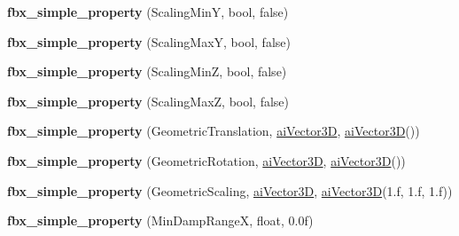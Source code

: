 \begin{DoxyCompactItemize}
\item 
\hypertarget{class_assimp_1_1_f_b_x_1_1_model_a75043fa25fb816150107e6b598e2dcb1}{{\bfseries fbx\+\_\+simple\+\_\+property} (Scaling\+Min\+Y, bool, false)}\label{class_assimp_1_1_f_b_x_1_1_model_a75043fa25fb816150107e6b598e2dcb1}

\item 
\hypertarget{class_assimp_1_1_f_b_x_1_1_model_ae8243792a552e8ffa023c413ed81dd76}{{\bfseries fbx\+\_\+simple\+\_\+property} (Scaling\+Max\+Y, bool, false)}\label{class_assimp_1_1_f_b_x_1_1_model_ae8243792a552e8ffa023c413ed81dd76}

\item 
\hypertarget{class_assimp_1_1_f_b_x_1_1_model_ae6c3c6187ab4387dce82b5fb9c5d9c20}{{\bfseries fbx\+\_\+simple\+\_\+property} (Scaling\+Min\+Z, bool, false)}\label{class_assimp_1_1_f_b_x_1_1_model_ae6c3c6187ab4387dce82b5fb9c5d9c20}

\item 
\hypertarget{class_assimp_1_1_f_b_x_1_1_model_a0e68f7410d2e93e98c76ca5ad36aa28c}{{\bfseries fbx\+\_\+simple\+\_\+property} (Scaling\+Max\+Z, bool, false)}\label{class_assimp_1_1_f_b_x_1_1_model_a0e68f7410d2e93e98c76ca5ad36aa28c}

\item 
\hypertarget{class_assimp_1_1_f_b_x_1_1_model_ae94a0d89ba100060b8827969cc9c0b36}{{\bfseries fbx\+\_\+simple\+\_\+property} (Geometric\+Translation, \hyperlink{structai_vector3_d}{ai\+Vector3\+D}, \hyperlink{structai_vector3_d}{ai\+Vector3\+D}())}\label{class_assimp_1_1_f_b_x_1_1_model_ae94a0d89ba100060b8827969cc9c0b36}

\item 
\hypertarget{class_assimp_1_1_f_b_x_1_1_model_ae8b6557ddf5ffb13dcc34214fd7c6886}{{\bfseries fbx\+\_\+simple\+\_\+property} (Geometric\+Rotation, \hyperlink{structai_vector3_d}{ai\+Vector3\+D}, \hyperlink{structai_vector3_d}{ai\+Vector3\+D}())}\label{class_assimp_1_1_f_b_x_1_1_model_ae8b6557ddf5ffb13dcc34214fd7c6886}

\item 
\hypertarget{class_assimp_1_1_f_b_x_1_1_model_a7c5018dc02a1f70dc4f52bac8ef78941}{{\bfseries fbx\+\_\+simple\+\_\+property} (Geometric\+Scaling, \hyperlink{structai_vector3_d}{ai\+Vector3\+D}, \hyperlink{structai_vector3_d}{ai\+Vector3\+D}(1.f, 1.f, 1.f))}\label{class_assimp_1_1_f_b_x_1_1_model_a7c5018dc02a1f70dc4f52bac8ef78941}

\item 
\hypertarget{class_assimp_1_1_f_b_x_1_1_model_abcd73ea823637f03c185029fb5c407eb}{{\bfseries fbx\+\_\+simple\+\_\+property} (Min\+Damp\+Range\+X, float, 0.\+0f)}\label{class_assimp_1_1_f_b_x_1_1_model_abcd73ea823637f03c185029fb5c407eb}


\end{DoxyCompactItemize}
